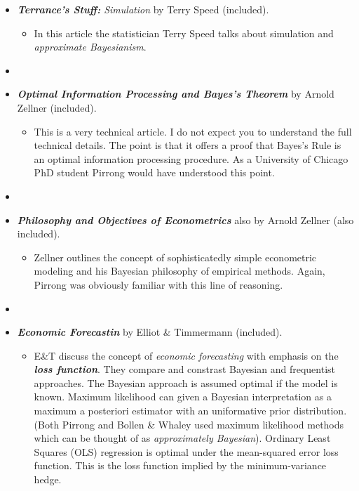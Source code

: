 \documentclass[12pt]{article}
\begin{document}
\begin{itemize}
	\item \textit{\textbf{Terrance's Stuff:} Simulation} by Terry Speed (included).
	  \begin{itemize}
	   \item In this article the statistician Terry Speed talks about simulation and \textit{approximate Bayesianism}.
	  \end{itemize}
	\item[]
	\item \textit{\textbf{Optimal Information Processing and Bayes's Theorem}} by Arnold Zellner (included).
	 \begin{itemize}
	  \item This is a very technical article. I do not expect you to understand the full technical details. The point is that it offers a proof that Bayes's Rule is an optimal 
		    information processing procedure. As a University of Chicago PhD student Pirrong would have understood this point. 
	 \end{itemize} 
	\item[]
	\item \textit{\textbf{Philosophy and Objectives of Econometrics}} also by Arnold Zellner (also included).
	 \begin{itemize}
	  \item Zellner outlines the concept of sophisticatedly simple econometric modeling and his Bayesian philosophy of empirical methods. Again, Pirrong was obviously familiar with this
		    line of reasoning.
	 \end{itemize}
	\item[]
	\item \textit{\textbf{Economic Forecastin}} by Elliot \& Timmermann (included).
	 \begin{itemize}
	  \item E\&T discuss the concept of \textit{economic forecasting} with emphasis on the \textit{\textbf{loss function}}. They compare and constrast Bayesian and frequentist approaches.
		    The Bayesian approach is assumed optimal if the model is known. Maximum likelihood can given a Bayesian interpretation as a maximum a posteriori estimator with an uniformative
			prior distribution. (Both Pirrong and Bollen \& Whaley used maximum likelihood methods which can be thought of as \textit{approximately Bayesian}). Ordinary Least Squares (OLS) 
			regression is optimal under the mean-squared error loss function. This is the loss function implied by the minimum-variance hedge. 
	  \end{itemize}
\end{itemize}
\end{document}
